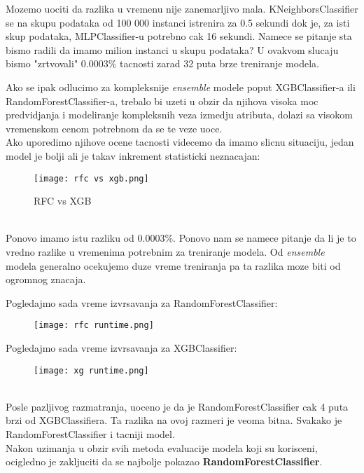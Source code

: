 \documentclass[10pt]{article}
\begin{document}
Mozemo uociti da razlika u vremenu nije zanemarljivo mala. KNeighborsClassifier se na skupu podataka od 100 000 instanci istrenira za 0.5 sekundi dok je, za isti skup podataka, MLPClassifier-u potrebno cak 16 sekundi. Namece se pitanje sta bismo radili da imamo milion instanci u skupu podataka? U ovakvom slucaju bismo "zrtvovali" 0.0003\% tacnosti zarad 32 puta brze treniranje modela. \pagebreak

Ako se ipak odlucimo za kompleksnije \textit{ensemble} modele poput XGBClassifier-a ili RandomForestClassifier-a, trebalo bi uzeti u obzir da njihova visoka moc predvidjanja i modeliranje kompleksnih veza izmedju atributa, dolazi sa visokom vremenskom cenom potrebnom da se te veze uoce.\\

Ako uporedimo njihove ocene tacnosti videcemo da imamo slicnu situaciju, jedan model je bolji ali je takav inkrement statisticki neznacajan:
\begin{figure}[h]
    \centering
    \texttt{[image: rfc vs xgb.png]}
    \caption{RFC vs XGB}
    \label{Slika8}
\end{figure}\\

Ponovo imamo istu razliku od 0.0003\%. Ponovo nam se namece pitanje da li je to vredno razlike u vremenima potrebnim za treniranje modela. Od \textit{ensemble} modela generalno ocekujemo duze vreme treniranja pa ta razlika moze biti od ogromnog znacaja.

\pagebreak
Pogledajmo sada vreme izvrsavanja za RandomForestClassifier:
\begin{figure}[h]
    \centering
    \texttt{[image: rfc runtime.png]}
    \label{Slika9}
\end{figure}

Pogledajmo sada vreme izvrsavanja za XGBClassifier:
\begin{figure}[h]
    \centering
    \texttt{[image: xg runtime.png]}
    \label{Slika10}
\end{figure}
\\

Posle pazljivog razmatranja, uoceno je da je RandomForestClassifier cak 4 puta brzi od XGBClassifiera. Ta razlika na ovoj razmeri je veoma bitna. Svakako je RandomForestClassifier i tacniji model.\\

Nakon uzimanja u obzir svih metoda evaluacije modela koji su korisceni, ocigledno je zakljuciti da se najbolje pokazao \textbf{RandomForestClassifier}.
\end{document}
